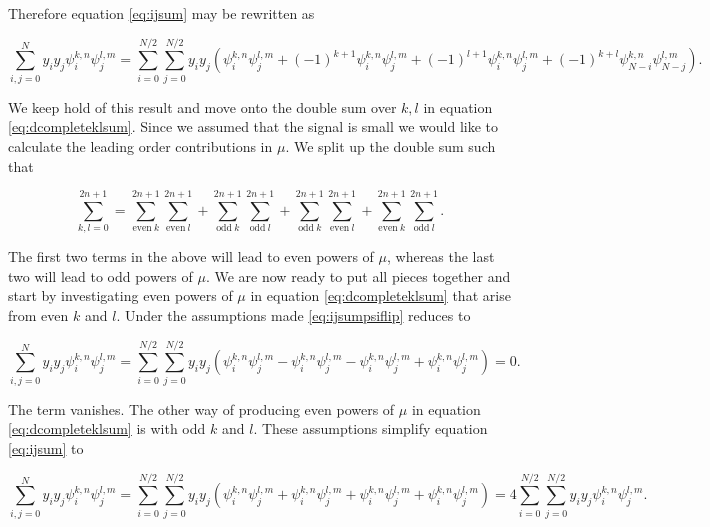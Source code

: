 \documentclass[apj]{emulateapj}
\begin{document}
Therefore equation \ref{eq:ijsum} may be rewritten as

\begin{equation} \label{eq:ijsumpsiflip}
\sum_{i,j = 0}^N y_i y_j \psi_i^{k, n} \psi_j^{l, m} = \sum_{i = 0}^{N/2}\sum_{j = 0}^{N/2} y_i y_j \left( \psi_i^{k, n} \psi_j^{l, m} + (-1)^{k+1} \psi_{i}^{k, n} \psi_j^{l, m} + (-1)^{l+1} \psi_i^{k, n} \psi_{j}^{l, m} + (-1)^{k+l} \psi_{N-i}^{k, n} \psi_{N-j}^{l, m} \right).
\end{equation}

We keep hold of this result and move onto the double sum over $k,l$ in equation \ref{eq:dcompleteklsum}. Since we assumed that the signal is small we would like to calculate the leading order contributions in $\mu$. We split up the double sum such that

\begin{equation} \label{eq:ksums}
\sum_{k, l = 0}^{2n+1} = \sum_{\mathrm{even} \> k}^{2n+1} \sum_{\mathrm{even} \> l}^{2n+1}  + \sum_{\mathrm{odd} \> k}^{2n+1} \sum_{\mathrm{odd} \> l}^{2n+1} + \sum_{\mathrm{odd} \> k}^{2n+1} \sum_{\mathrm{even} \> l}^{2n+1}  + \sum_{\mathrm{even} \> k}^{2n+1} \sum_{\mathrm{odd} \> l}^{2n+1}.
\end{equation}

The first two terms in the above will lead to even powers of $\mu$, whereas the last two will lead to odd powers of $\mu$. We are now ready to put all pieces together and start by investigating even powers of $\mu$ in equation \ref{eq:dcompleteklsum} that arise from even $k$ and $l$. Under the assumptions made \ref{eq:ijsumpsiflip} reduces to

\begin{equation}
\sum_{i,j = 0}^N y_i y_j \psi_i^{k, n} \psi_j^{l, m} = \sum_{i = 0}^{N/2}\sum_{j = 0}^{N/2} y_i y_j  \left( \psi_i^{k, n} \psi_j^{l, m} - \psi_{i}^{k, n} \psi_j^{l, m} - \psi_i^{k, n} \psi_{j}^{l, m} + \psi_{i}^{k, n} \psi_{j}^{l, m} \right) = 0.
\end{equation}

The term vanishes. The other way of producing even powers of $\mu$ in equation \ref{eq:dcompleteklsum} is with odd $k$ and $l$. These assumptions simplify equation \ref{eq:ijsum} to

\begin{equation}
\sum_{i,j = 0}^N y_i y_j \psi_i^{k, n} \psi_j^{l, m} = \sum_{i = 0}^{N/2}\sum_{j = 0}^{N/2} y_i y_j \left( \psi_i^{k, n} \psi_j^{l, m} + \psi_{i}^{k, n} \psi_j^{l, m} + \psi_i^{k, n} \psi_{j}^{l, m} + \psi_{i}^{k, n} \psi_{j}^{l, m} \right) = 4 \sum_{i = 0}^{N/2}\sum_{j = 0}^{N/2} y_i y_j \psi_i^{k, n} \psi_j^{l, m}.
\end{equation}
\end{document}
